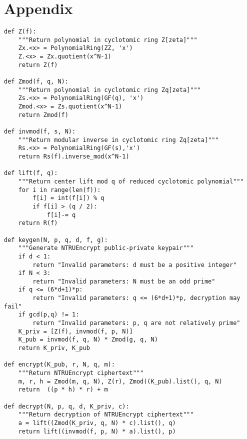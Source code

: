 \documentclass[10pt,reqno]{article}
\begin{document}
\section{Appendix}
\label{code:sage-ntruencrypt}
\begin{lstlisting}[caption=\textsf{NTRUEncrypt}]
def Z(f):
    """Return polynomial in cyclotomic ring Z[zeta]"""
    Zx.<x> = PolynomialRing(ZZ, 'x')
    Z.<x> = Zx.quotient(x^N-1)
    return Z(f)

def Zmod(f, q, N):
    """Return polynomial in cyclotomic ring Zq[zeta]"""
    Zs.<x> = PolynomialRing(GF(q), 'x')
    Zmod.<x> = Zs.quotient(x^N-1)
    return Zmod(f)

def invmod(f, s, N):
    """Return modular inverse in cyclotomic ring Zq[zeta]"""
    Rs.<x> = PolynomialRing(GF(s),'x')
    return Rs(f).inverse_mod(x^N-1)

def lift(f, q):
    """Return center lift mod q of reduced cyclotomic polynomial"""
    for i in range(len(f)):
        f[i] = int(f[i]) % q
        if f[i] > (q / 2):
            f[i]-= q
    return R(f)

def keygen(N, p, q, d, f, g):
    """Generate NTRUEncrypt public-private keypair"""
    if d < 1:
        return "Invalid parameters: d must be a positive integer"
    if N < 3:
        return "Invalid parameters: N must be an odd prime"
    if q <= (6*d+1)*p:
        return "Invalid parameters: q <= (6*d+1)*p, decryption may fail"
    if gcd(p,q) != 1:
        return "Invalid parameters: p, q are not relatively prime"
    K_priv = [Z(f), invmod(f, p, N)]
    K_pub = invmod(f, q, N) * Zmod(g, q, N)
    return K_priv, K_pub

def encrypt(K_pub, r, N, q, m):
    """Return NTRUEncrypt ciphertext"""
    m, r, h = Zmod(m, q, N), Z(r), Zmod((K_pub).list(), q, N)
    return  ((p * h) * r) + m

def decrypt(N, p, q, d, K_priv, c):
    """Return decryption of NTRUEncrypt ciphertext"""
    a = lift((Zmod(K_priv, q, N) * c).list(), q)
    return lift((invmod(f, p, N) * a).list(), p)
\end{lstlisting}
\end{document}
